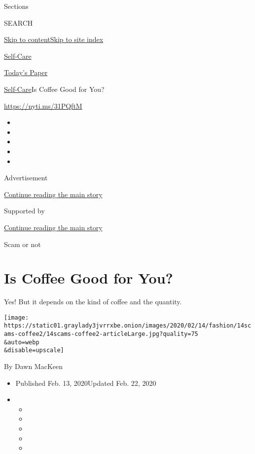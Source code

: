 Sections

SEARCH

\protect\hyperlink{site-content}{Skip to
content}\protect\hyperlink{site-index}{Skip to site index}

\href{https://www.nytimes3xbfgragh.onion/section/style/self-care/}{Self-Care}

\href{https://myaccount.nytimes3xbfgragh.onion/auth/login?response_type=cookie\&client_id=vi}{}

\href{https://www.nytimes3xbfgragh.onion/section/todayspaper}{Today's
Paper}

\href{/section/style/self-care/}{Self-Care}\textbar{}Is Coffee Good for
You?

\href{https://nyti.ms/31PQftM}{https://nyti.ms/31PQftM}

\begin{itemize}
\item
\item
\item
\item
\item
\end{itemize}

Advertisement

\protect\hyperlink{after-top}{Continue reading the main story}

Supported by

\protect\hyperlink{after-sponsor}{Continue reading the main story}

Scam or not

\hypertarget{is-coffee-good-for-you}{%
\section{Is Coffee Good for You?}\label{is-coffee-good-for-you}}

Yes! But it depends on the kind of coffee and the quantity.

\texttt{[image: https://static01.graylady3jvrrxbe.onion/images/2020/02/14/fashion/14scams-coffee2/14scams-coffee2-articleLarge.jpg?quality=75\\\&auto=webp\\\&disable=upscale]}

By Dawn MacKeen

\begin{itemize}
\item
  Published Feb. 13, 2020Updated Feb. 22, 2020
\item
  \begin{itemize}
  \item
  \item
  \item
  \item
  \item
  \end{itemize}
\end{itemize}

